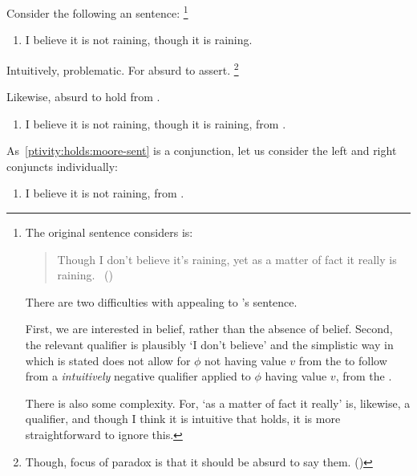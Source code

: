 \begin{note}
  Consider the following \citeauthor{Moore:1993wk}an sentence:%
  \footnote{
    The original sentence \citeauthor{Moore:1993wk} considers is:

    \begin{quote}
      Though I don't believe it's raining, yet as a matter of fact it really is raining.%
      \mbox{ }\hfill\mbox{(\citeyear[207]{Moore:1993wk})}
    \end{quote}
    There are two difficulties with appealing to \citeauthor{Moore:1993wk}'s sentence.

    First, we are interested in belief, rather than the absence of belief.
    Second, the relevant qualifier is plausibly `I don't believe' and the simplistic way in which \ptivity{} is stated does not allow for \(\phi\) not having value \(v\) from the \agpe{} to follow from a \emph{intuitively} negative qualifier applied to \(\phi\) having value \(v\), from the \agpe{}.

    There is also some complexity.
    For, `as a matter of fact it really' is, likewise, a qualifier, and though I think it is intuitive that \ptivity{} holds, it is more straightforward to ignore this.
  }

  \begin{enumerate}[label=\emph{M}., ref=(\emph{M})]
  \item
    \label{ptivity:holds:moore-sent}
    I believe it is not raining, though it is raining.
  \end{enumerate}

  Intuitively, problematic.
  For \citeauthor{Moore:1993wk} absurd to assert.%
  \footnote{
    Though, focus of paradox is that it should be absurd to say them.
    (\citeyear[Cf.][208]{Moore:1993wk})
  }

  Likewise, absurd to hold from \agpe{}.

  \begin{enumerate}[label=\emph{M\('\)}., ref=(\emph{M\('\)})]
  \item
    \label{ptivity:holds:moore-sent:pers}
    I believe it is not raining, though it is raining, from .
  \end{enumerate}


  As~\ref{ptivity:holds:moore-sent} is a conjunction, let us consider the left and right conjuncts individually:

  \begin{enumerate}[label=\emph{M\('\)\textsubscript{l}}., ref=(\emph{M\('\)\textsubscript{l}})]
  \item
    \label{ptivity:holds:moore-sent:pers:l}
    I believe it is not raining, from .
  \end{enumerate}


\end{note}
